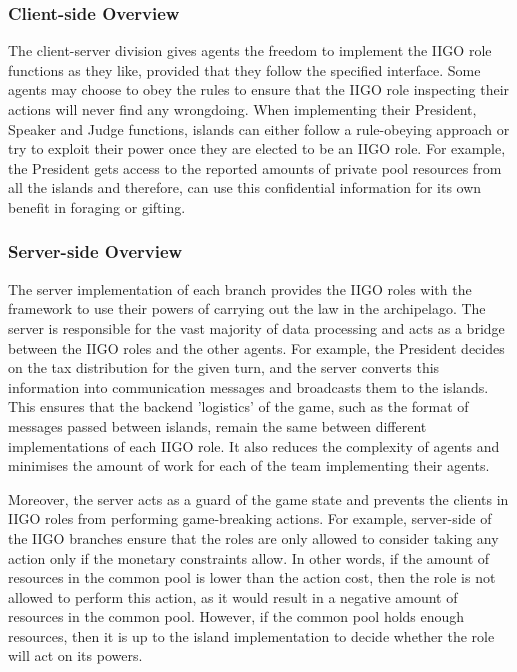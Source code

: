 \subsubsection{Client-side Overview}
The client-server division gives agents the freedom to implement the IIGO role functions as they like, provided that they follow the specified interface. Some agents may choose to obey the rules to ensure that the IIGO role inspecting their actions will never find any wrongdoing. When implementing their President, Speaker and Judge functions, islands can either follow a rule-obeying approach or try to exploit their power once they are elected to be an IIGO role. For example, the President gets access to the reported amounts of private pool resources from all the islands and therefore, can use this confidential information for its own benefit in foraging or gifting.

\subsubsection{Server-side Overview}
The server implementation of each branch provides the IIGO roles with the framework to use their powers of carrying out the law in the archipelago. The server is responsible for the vast majority of data processing and acts as a bridge between the IIGO roles and the other agents. For example, the President decides on the tax distribution for the given turn, and the server converts this information into communication messages and broadcasts them to the islands. This ensures that the backend 'logistics' of the game, such as the format of messages passed between islands, remain the same between different implementations of each IIGO role. It also reduces the complexity of agents and minimises the amount of work for each of the team implementing their agents.

Moreover, the server acts as a guard of the game state and prevents the clients in IIGO roles from performing game-breaking actions. For example, server-side of the IIGO branches ensure that the roles are only allowed to consider taking any action only if the monetary constraints allow. In other words, if the amount of resources in the common pool is lower than the action cost, then the role is not allowed to perform this action, as it would result in a negative amount of resources in the common pool. However, if the common pool holds enough resources, then it is up to the island implementation to decide whether the role will act on its powers.


